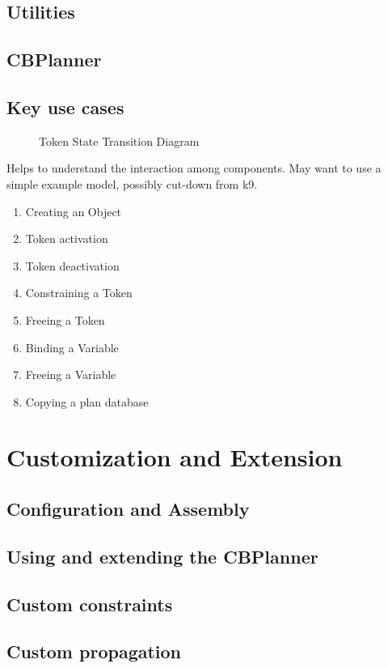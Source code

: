 \documentclass[10pt, letterpaper, twoside]{article}
\begin{document}
{\subsection{Utilities}
\subsection{CBPlanner}
\subsection{Key use cases}


\begin{figure}[t]
\centering{}
\caption{Token State Transition Diagram}
\label{TokenStateModel}
\end{figure}

Helps to understand the interaction among components. May want to use
a simple example model, possibly cut-down from k9.
\begin{enumerate}
\item Creating an Object
\item Token activation
\item Token deactivation
\item Constraining a Token
\item Freeing a Token
\item Binding a Variable
\item Freeing a Variable
\item Copying a plan database
\end{enumerate}

\section{Customization and Extension}
\subsection{Configuration and Assembly}
\subsection{Using and extending the CBPlanner}
\subsection{Custom constraints}
\subsection{Custom propagation}
}
\end{document}
